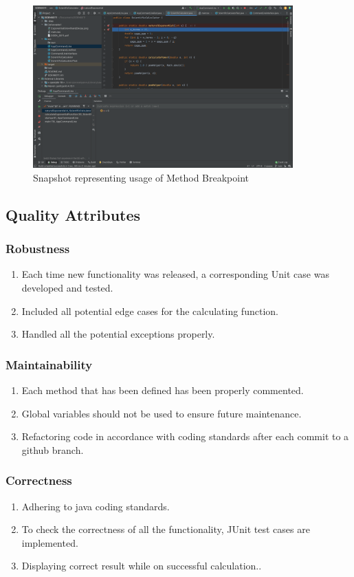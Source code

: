 \documentclass[a4paper,12pt]{report}
\begin{document}
\begin{figure}[h]
\centering
\includegraphics[width=10cm]{MethodBreakpoint.png}
\caption{Snapshot representing usage of Method Breakpoint}
\label{exp}
\end{figure}

\pagebreak

\subsection{Quality Attributes}
\subsubsection{Robustness}
\begin{enumerate}
   \item Each time new functionality was released, a corresponding Unit case was developed and tested.
   \item Included all potential edge cases for the calculating function.
   \item Handled all the potential exceptions properly.
\end{enumerate}
\subsubsection{Maintainability}
\begin{enumerate}
   \item Each method that has been defined has been properly commented.
   \item Global variables should not be used to ensure future maintenance.
   \item Refactoring code in accordance with coding standards after each commit to a github branch.
\end{enumerate}
\subsubsection{Correctness}
\begin{enumerate}
   \item Adhering to java coding standards.
   \item To check the correctness of all the functionality, JUnit test cases are implemented.
   \item Displaying correct result while on successful calculation..
\end{enumerate}
\end{document}
